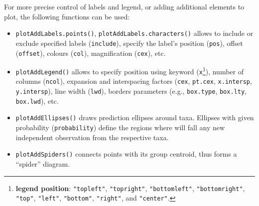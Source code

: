 \documentclass[
]{article}
\begin{document}
For more precise control of labels and legend, or adding additional
elements to plot, the following functions can be used:

\begin{itemize}
\item
  \texttt{plotAddLabels.points()}, \texttt{plotAddLabels.characters()}
  allows to include or exclude specified labels (\texttt{include}),
  specify the label's position (\texttt{pos}), offset (\texttt{offset}),
  colours (\texttt{col}), magnification (\texttt{cex}), etc.
\item
  \texttt{plotAddLegend()} allows to specify position using keyword
  (\texttt{x}\footnote{\textbf{legend position}: \texttt{"topleft"},
    \texttt{"topright"}, \texttt{"bottomleft"}, \texttt{"bottomright"},
    \texttt{"top"}, \texttt{"left"}, \texttt{"bottom"},
    \texttt{"right"}, and \texttt{"center"}.}), number of columns
  (\texttt{ncol}), expansion and interspacing factors (\texttt{cex},
  \texttt{pt.cex}, \texttt{x.intersp}, \texttt{y.intersp}), line width
  (\texttt{lwd}), borders parameters (e.g., \texttt{box.type},
  \texttt{box.lty}, \texttt{box.lwd}), etc.
\item
  \texttt{plotAddEllipses()} draws prediction ellipses around taxa.
  Ellipses with given probability (\texttt{probability}) define the
  regions where will fall any new independent observation from the
  respective taxa.
\item
  \texttt{plotAddSpiders()} connects points with its group centroid,
  thus forms a ``spider'' diagram.
\end{itemize}
\end{document}
